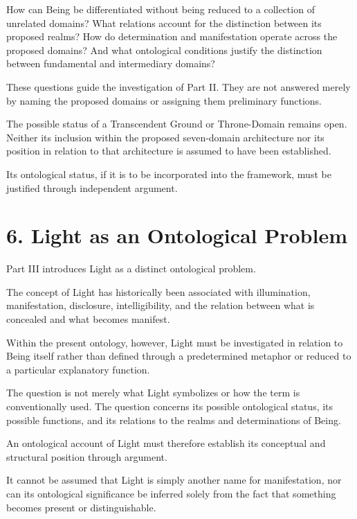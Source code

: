 How can Being be differentiated without being
reduced to a collection of unrelated domains?
What relations account for the distinction between
its proposed realms? How do determination and
manifestation operate across the proposed domains?
And what ontological conditions justify the distinction
between fundamental and intermediary domains?

These questions guide the investigation of Part II.
They are not answered merely by naming the proposed
domains or assigning them preliminary functions.

The possible status of a Transcendent Ground
or Throne-Domain remains open. Neither its inclusion
within the proposed seven-domain architecture nor
its position in relation to that architecture is
assumed to have been established.

Its ontological status, if it is to be incorporated
into the framework, must be justified through
independent argument.


\section*{6. Light as an Ontological Problem}

Part III introduces Light as a distinct ontological
problem.

The concept of Light has historically been associated
with illumination, manifestation, disclosure,
intelligibility, and the relation between what is
concealed and what becomes manifest.

Within the present ontology, however, Light must
be investigated in relation to Being itself rather
than defined through a predetermined metaphor
or reduced to a particular explanatory function.

The question is not merely what Light symbolizes
or how the term is conventionally used. The question
concerns its possible ontological status, its possible
functions, and its relations to the realms and
determinations of Being.

An ontological account of Light must therefore
establish its conceptual and structural position
through argument.

It cannot be assumed that Light is simply another
name for manifestation, nor can its ontological
significance be inferred solely from the fact that
something becomes present or distinguishable.

